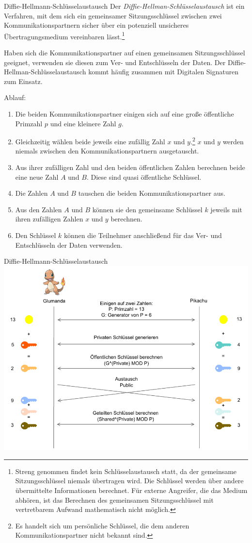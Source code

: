 \begin{defi}{Diffie-Hellmann-Schlüsselaustausch}
    Der \emph{Diffie-Hellman-Schlüsselaustausch} ist ein Verfahren, mit dem sich ein gemeinsamer Sitzungsschlüssel zwischen zwei Kommunikationspartnern sicher über ein potenziell unsicheres Übertragungsmedium vereinbaren lässt.\footnote{Streng genommen findet kein Schlüsselaustausch statt, da der gemeinsame Sitzungsschlüssel niemals übertragen wird. Die Schlüssel werden über andere übermittelte Informationen berechnet. Für externe Angreifer, die das Medium abhören, ist das Berechnen des gemeinsamen Sitzungsschlüssel mit vertretbarem Aufwand mathematisch nicht möglich.}

    Haben sich die Kommunikationspartner auf einen gemeinsamen Sitzungsschlüssel geeignet, verwenden sie diesen zum Ver- und Entschlüsseln der Daten. Der Diffie-Hellman-Schlüsselaustausch kommt häufig zusammen mit Digitalen Signaturen zum Einsatz.

    Ablauf:
    \begin{enumerate}
        \item Die beiden Kommunikationspartner einigen sich auf eine große öffentliche Primzahl $p$ und eine kleinere Zahl $g$.
        \item Gleichzeitig wählen beide jeweils eine zufällig Zahl $x$ und $y$.\footnote{Es handelt sich um persönliche Schlüssel, die dem anderen Kommunikationspartner nicht bekannt sind.} $x$ und $y$ werden niemals zwischen den Kommunikationspartnern ausgetauscht.
        \item Aus ihrer zufälligen Zahl und den beiden öffentlichen Zahlen berechnen beide eine neue Zahl $A$ und $B$. Diese sind quasi öffentliche Schlüssel.
        \item Die Zahlen $A$ und $B$ tauschen die beiden Kommunikationspartner aus.
        \item Aus den Zahlen $A$ und $B$ können sie den gemeinsame Schlüssel $k$ jeweils mit ihren zufälligen Zahlen $x$ und $y$ berechnen.
        \item Den Schlüssel $k$ können die Teilnehmer anschließend für das Ver- und Entschlüsseln der Daten verwenden.
    \end{enumerate}
\end{defi}

\begin{example}{Diffie-Hellmann-Schlüsselaustausch}
    \centering
    \includegraphics[width=.7\textwidth]{includes/figures/example_deffie_hellman.pdf}
\end{example}


